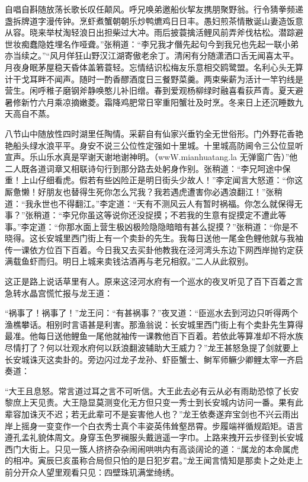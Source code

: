 \documentclass[12pt,UTF8]{ctexbook}
\begin{document}
{自唱自斟随放荡长歌长叹任颠风。呼兄唤弟邀船伙挈友携朋聚野翁。行令猜拳频递盏拆牌道字漫传钟。烹虾煮蟹朝朝乐炒鸭爊鸡日日丰。愚妇煎茶情散诞山妻造饭意从容。晓来举杖淘轻浪日出担柴过大冲。雨后披蓑擒活鲤风前弄斧伐枯松。潜踪避世妆痴蠢隐姓埋名作哑聋。”张稍道：“李兄我才僭先起句今到我兄也先起一联小弟亦当续之。”“风月佯狂山野汉江湖寄傲老余丁。清闲有分随潇洒口舌无闻喜太平。月夜身眠茅屋稳天昏体盖箬蓑轻。忘情结识松梅友乐意相交鸥鹭盟。名利心头无算计干戈耳畔不闻声。随时一酌香醪酒度日三餐野菜羹。两束柴薪为活计一竿钓线是营生。闲呼稚子磨钢斧静唤憨儿补旧缯。春到爱观杨柳绿时融喜看荻芦青。夏天避暑修新竹六月乘凉摘嫩菱。霜降鸡肥常日宰重阳蟹壮及时烹。冬来日上还沉睡数九天高自不蒸。

八节山中随放性四时湖里任陶情。采薪自有仙家兴垂钓全无世俗形。门外野花香艳艳船头绿水浪平平。身安不说三公位性定强如十里城。十里城高防阃令三公位显听宣声。乐山乐水真是罕谢天谢地谢神明。（wwW.mianhuatang.la 无弹窗广告）”他二人既各道词章又相联诗句行到那分路去处躬身作别。张稍道：“李兄呵途中保重！上山仔细看虎。假若有些凶险正是明日街头少故人！”李定闻言大怒道：“你这厮惫懒！好朋友也替得生死你怎么咒我？我若遇虎遭害你必遇浪翻江！”张稍道：“我永世也不得翻江。”李定道：“天有不测风云人有暂时祸福。你怎么就保得无事？”张稍道：“李兄你虽这等说你还没捉摸；不若我的生意有捉摸定不遭此等事。”李定道：“你那水面上营生极凶极险隐隐暗暗有甚么捉摸？”张稍道：“你是不晓得。这长安城里西门街上有一个卖卦的先生。我每日送他一尾金色鲤他就与我袖传一课依方位百下百着。今日我又去买卦他教我在泾河湾头东边下网西岸抛钓定获满载鱼虾而归。明日上城来卖钱沽酒再与老兄相叙。”二人从此叙别。

这正是路上说话草里有人。原来这泾河水府有一个巡水的夜叉听见了百下百着之言急转水晶宫慌忙报与龙王道：

“祸事了！祸事了！”龙王问：“有甚祸事？”夜叉道：“臣巡水去到河边只听得两个渔樵攀话。相别时言语甚是利害。那渔翁说：长安城里西门街上有个卖卦先生算得最准。他每日送他鲤鱼一尾他就袖传一课教他百下百着。若依此等算准却不将水族尽情打了？何以壮观水府何以跃浪翻波辅助大王威力？”龙王甚怒急提了剑就要上长安城诛灭这卖卦的。旁边闪过龙子龙孙、虾臣蟹士、鲥军师鳜少卿鲤太宰一齐启奏道：

“大王且息怒。常言道过耳之言不可听信。大王此去必有云从必有雨助恐惊了长安黎庶上天见责。大王隐显莫测变化无方但只变一秀士到长安城内访问一番。果有此辈容加诛灭不迟；若无此辈可不是妄害他人也？”龙王依奏遂弃宝剑也不兴云雨出岸上摇身一变变作一个白衣秀士真个丰姿英伟耸壑昂霄。步履端祥循规蹈矩。语言遵孔孟礼貌体周文。身穿玉色罗襕服头戴逍遥一字巾。上路来拽开云步径到长安城西门大街上。只见一簇人挤挤杂杂闹闹哄哄内有高谈阔论的道：“属龙的本命属虎的相冲。寅辰巳亥虽称合局但只怕的是日犯岁君。”龙王闻言情知是那卖卜之处走上前分开众人望里观看只见：四壁珠玑满堂绮绣。

}
\end{document}
